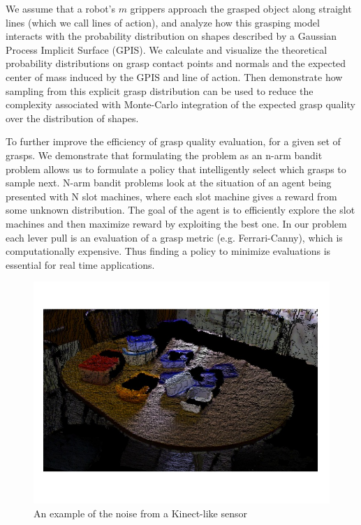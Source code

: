 \documentclass[letterpaper, 10 pt, conference]{ieeeconf}  %
\begin{document}
We assume that a robot's $m$ grippers approach the grasped object along straight lines (which we call lines of action), and analyze how this grasping model interacts with the probability distribution on shapes described by a Gaussian Process Implicit Surface (GPIS). We calculate and visualize the theoretical probability distributions on grasp contact points and normals and the expected center of mass induced by the GPIS and line of action. Then demonstrate how sampling from this explicit grasp distribution can be used to reduce the complexity associated with Monte-Carlo integration of the expected grasp quality over the distribution of shapes. 

To further improve the efficiency of grasp quality evaluation, for a given set of grasps. We demonstrate that formulating the problem as an n-arm bandit problem allows us to formulate a policy that intelligently select which grasps to sample next. N-arm bandit problems look at the situation of an agent being presented with N slot machines, where each slot machine gives a reward from some unknown distribution. The goal of the agent is to efficiently explore the slot machines and then maximize reward by exploiting the best one. In our problem each lever pull is an evaluation of a grasp metric (e.g. Ferrari-Canny), which is computationally expensive. Thus finding a policy to minimize evaluations is essential for real time applications. 



\begin{figure}[ht!]
\centering
\includegraphics[scale = 0.3]{figures/Slide02.jpg}
\caption{An example of the noise from a Kinect-like sensor}
\vspace*{-10pt}
\label{fig:noisy data}
\end{figure}
\end{document}
